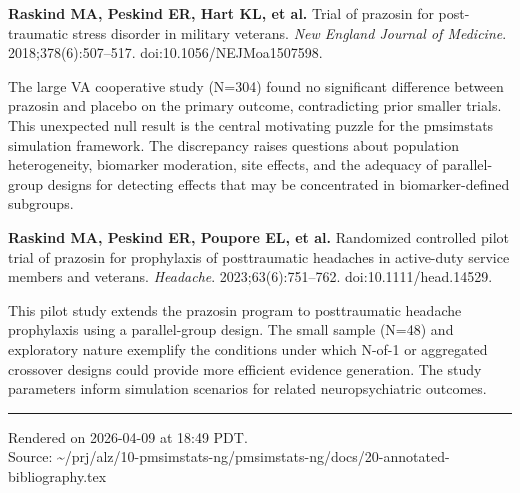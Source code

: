 \documentclass[11pt]{article}
\begin{document}
\medskip
\textbf{Raskind MA, Peskind ER, Hart KL, et al.} Trial of
prazosin for post-traumatic stress disorder in military
veterans. \textit{New England Journal of Medicine}.
2018;378(6):507--517. doi:10.1056/NEJMoa1507598.

\smallskip\noindent
The large VA cooperative study (N=304) found no significant
difference between prazosin and placebo on the primary
outcome, contradicting prior smaller trials. This
unexpected null result is the central motivating puzzle for
the pmsimstats simulation framework. The discrepancy
raises questions about population heterogeneity, biomarker
moderation, site effects, and the adequacy of
parallel-group designs for detecting effects that may be
concentrated in biomarker-defined subgroups.

\medskip
\textbf{Raskind MA, Peskind ER, Poupore EL, et al.}
Randomized controlled pilot trial of prazosin for
prophylaxis of posttraumatic headaches in active-duty
service members and veterans. \textit{Headache}.
2023;63(6):751--762. doi:10.1111/head.14529.

\smallskip\noindent
This pilot study extends the prazosin program to
posttraumatic headache prophylaxis using a parallel-group
design. The small sample (N=48) and exploratory nature
exemplify the conditions under which N-of-1 or aggregated
crossover designs could provide more efficient evidence
generation. The study parameters inform simulation
scenarios for related neuropsychiatric outcomes.

\vfill
\noindent\rule{\textwidth}{0.4pt}
{\footnotesize Rendered on 2026-04-09 at 18:49 PDT.\\
Source: \textasciitilde/prj/alz/10-pmsimstats-ng/pmsimstats-ng/docs/20-annotated-bibliography.tex}
\end{document}
